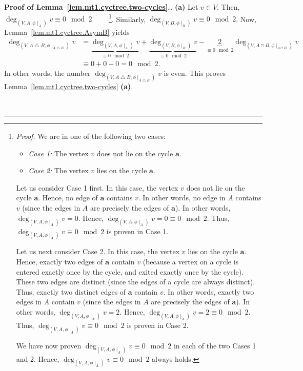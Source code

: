 \documentclass[numbers=enddot,12pt,final,onecolumn,notitlepage]{scrartcl}%
\theoremstyle{definition}
\newenvironment{proof}[1][Proof]{\noindent\textbf{#1.} }{\ \rule{0.5em}{0.5em}}
\newcommand{\tup}[1]{\left( #1 \right)}
\begin{document}
\begin{proof}[Proof of Lemma~\ref{lem.mt1.cyctree.two-cycles}.]
\textbf{(a)} Let $v \in V$. Then,
$\deg_{\tup{V, A, \phi\mid_A}} v \equiv 0 \mod 2$
\ \ \ \ \footnote{\textit{Proof.} We are in one of the following two
cases:

\begin{itemize}
\item \textit{Case 1:} The vertex $v$ does not lie on the cycle
        $\mathbf{a}$.
\item \textit{Case 2:} The vertex $v$ lies on the cycle $\mathbf{a}$.
\end{itemize}

Let us consider Case 1 first. In this case, the vertex $v$ does not
lie on the cycle $\mathbf{a}$. Hence, no edge of $\mathbf{a}$ contains
$v$. In other words, no edge in $A$ contains $v$ (since the edges in
$A$ are precisely the edges of $\mathbf{a}$). In other words,
$\deg_{\tup{V, A, \phi\mid_A}} v = 0$. Hence,
$\deg_{\tup{V, A, \phi\mid_A}} v = 0 \equiv 0 \mod 2$. Thus,
$\deg_{\tup{V, A, \phi\mid_A}} v \equiv 0 \mod 2$ is proven in Case 1.

Let us next consider Case 2. In this case, the vertex $v$ lies on the
cycle $\mathbf{a}$. Hence, exactly two edges of $\mathbf{a}$ contain
$v$ (because a vertex on a cycle is entered exactly once by the cycle,
and exited exactly once by the cycle). These two edges are distinct
(since the edges of a cycle are always distinct). Thus, exactly two
distinct edges of $\mathbf{a}$ contain $v$. In other words, exactly
two edges in $A$ contain $v$ (since the edges in $A$ are precisely
the edges of $\mathbf{a}$). In other words,
$\deg_{\tup{V, A, \phi\mid_A}} v = 2$. Hence,
$\deg_{\tup{V, A, \phi\mid_A}} v = 2 \equiv 0 \mod 2$. Thus,
$\deg_{\tup{V, A, \phi\mid_A}} v \equiv 0 \mod 2$ is proven in Case 2.

We have now proven
$\deg_{\tup{V, A, \phi\mid_A}} v \equiv 0 \mod 2$ in each of the two
Cases 1 and 2. Hence,
$\deg_{\tup{V, A, \phi\mid_A}} v \equiv 0 \mod 2$ always holds.}.
Similarly,
$\deg_{\tup{V, B, \phi\mid_B}} v \equiv 0 \mod 2$.
Now, Lemma~\ref{lem.mt1.cyctree.AsymB} yields
\begin{align*}
\deg_{\tup{V, A \bigtriangleup B, \phi\mid_{A \bigtriangleup B}}} v
&= \underbrace{\deg_{\tup{V, A, \phi\mid_A}} v}_{\equiv 0 \mod 2}
   + \underbrace{\deg_{\tup{V, B, \phi\mid_B}} v}_{\equiv 0 \mod 2}
   - \underbrace{2}_{\equiv 0 \mod 2}
        \deg_{\tup{V, A \cap B, \phi\mid_{A \cap B}}} v \\
&\equiv 0 + 0 - 0 = 0 \mod 2 .
\end{align*}
In other words, the number
$\deg_{\tup{V, A \bigtriangleup B, \phi\mid_{A \bigtriangleup B}}} v$
is even.
This proves Lemma~\ref{lem.mt1.cyctree.two-cycles} \textbf{(a)}.


\end{proof}
\end{document}
